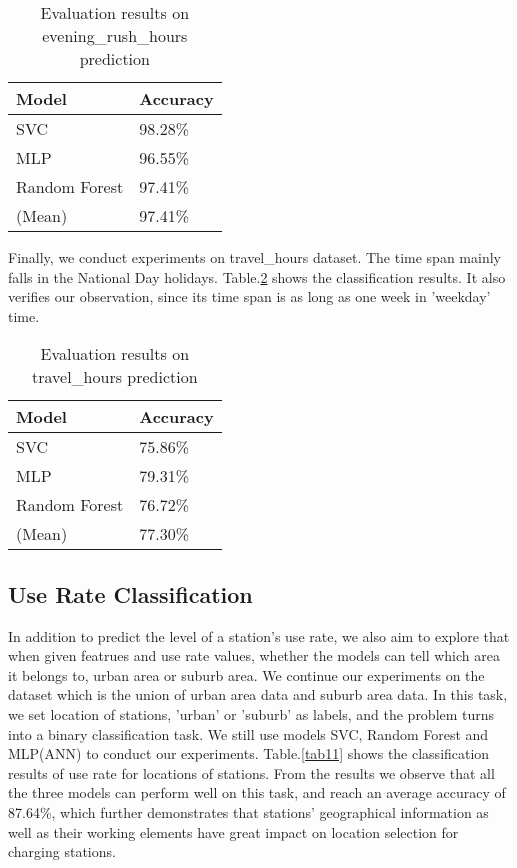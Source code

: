 \begin{table}[!htbp]
	\caption{Evaluation results on evening\_rush\_hours prediction}
	\begin{center}
		\begin{tabular}{|l|l|}
			\hline
			Model & Accuracy\\
			\hline
			SVC & 98.28\%\\
			\hline
			MLP & 96.55\%\\
			\hline
			Random Forest & 97.41\%\\
			\hline
			(Mean) & 97.41\%\\
			\hline
		\end{tabular}
		\label{tab9}
	\end{center}
\end{table}
Finally, we conduct experiments on travel\_hours dataset. The time span mainly falls in the National Day holidays. Table.\ref{tab10} shows the classification results. It also verifies our observation, since its time span is as long as one week in 'weekday' time.

\begin{table}[!htbp]
	\caption{Evaluation results on travel\_hours prediction}
	\begin{center}
		\begin{tabular}{|l|l|}
			\hline
			Model & Accuracy\\
			\hline
			SVC & 75.86\%\\
			\hline
			MLP & 79.31\%\\
			\hline
			Random Forest & 76.72\%\\
			\hline
			(Mean) & 77.30\%\\
			\hline
		\end{tabular}
		\label{tab10}
	\end{center}
\end{table}

\subsection{Use Rate Classification}
In addition to predict the level of a station's use rate, we also aim to explore that when given featrues and use rate values, whether the models can tell which area it belongs to, urban area or suburb area. We continue our experiments on the dataset which is the union of urban area data and suburb area data. In this task, we set location of stations, 'urban' or 'suburb' as labels, and the problem turns into a binary classification task. We still use models SVC, Random Forest and MLP(ANN) to conduct our experiments. Table.\ref{tab11} shows the classification results of use rate for locations of stations. From the results we observe that all the three models can perform well on this task, and reach an average accuracy of 87.64\%, which further demonstrates that stations' geographical information as well as their working elements have great impact on location selection for charging stations.

